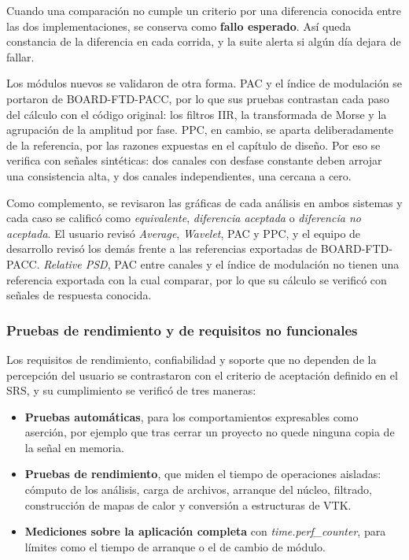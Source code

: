 \documentclass[12pt,letterpaper,oneside]{article}
\begin{document}
Cuando una comparación no cumple un criterio por una diferencia conocida entre las dos implementaciones, se conserva como \textbf{fallo esperado}. Así queda constancia de la diferencia en cada corrida, y la suite alerta si algún día dejara de fallar.

Los módulos nuevos se validaron de otra forma. PAC y el índice de modulación se portaron de BOARD-FTD-PACC, por lo que sus pruebas contrastan cada paso del cálculo con el código original: los filtros IIR, la transformada de Morse y la agrupación de la amplitud por fase. PPC, en cambio, se aparta deliberadamente de la referencia, por las razones expuestas en el capítulo de diseño. Por eso se verifica con señales sintéticas: dos canales con desfase constante deben arrojar una consistencia alta, y dos canales independientes, una cercana a cero.

Como complemento, se revisaron las gráficas de cada análisis en ambos sistemas y cada caso se calificó como \textit{equivalente}, \textit{diferencia aceptada} o \textit{diferencia no aceptada}. El usuario revisó \textit{Average}, \textit{Wavelet}, PAC y PPC, y el equipo de desarrollo revisó los demás frente a las referencias exportadas de BOARD-FTD-PACC. \textit{Relative PSD}, PAC entre canales y el índice de modulación no tienen una referencia exportada con la cual comparar, por lo que su cálculo se verificó con señales de respuesta conocida.

\subsubsection{Pruebas de rendimiento y de requisitos no funcionales}

Los requisitos de rendimiento, confiabilidad y soporte que no dependen de la percepción del usuario se contrastaron con el criterio de aceptación definido en el SRS, y su cumplimiento se verificó de tres maneras:

\begin{itemize}
  \item \textbf{Pruebas automáticas}, para los comportamientos expresables como aserción, por ejemplo que tras cerrar un proyecto no quede ninguna copia de la señal en memoria.
  \item \textbf{Pruebas de rendimiento}, que miden el tiempo de operaciones aisladas: cómputo de los análisis, carga de archivos, arranque del núcleo, filtrado, construcción de mapas de calor y conversión a estructuras de VTK.
  \item \textbf{Mediciones sobre la aplicación completa} con \textit{time.perf\_counter}, para límites como el tiempo de arranque o el de cambio de módulo.
\end{itemize}
\end{document}
